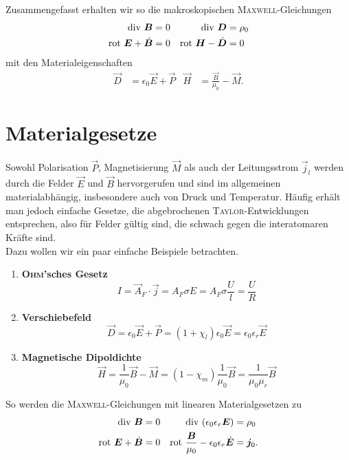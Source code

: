 Zusammengefasst erhalten wir so die makroskopischen \textsc{Maxwell}-Gleichungen
\begin{align*}
\text{div }\bm{B} &=0 &\text{div }\bm{D} &= \rho_0\\
\text{rot } \bm{E} + \dot{\bm{B}} &= 0 &\text{rot } \bm{H}-\dot{\bm{D}}&=0
\end{align*}
mit den Materialeigenschaften
\begin{align*}
\vec{D}&=\epsilon_0\vec{E}+\vec{P} &\vec{H} &= \frac{\vec{B}}{\mu_0} -\vec{M}.
\end{align*}

\section{Materialgesetze}

Sowohl Polarisation $\vec{P}$, Magnetisierung $\vec{M}$ als auch der Leitungsstrom $\vec{j}_l$ werden durch die Felder $\vec{E}$ und $\vec{B}$ hervorgerufen und sind im allgemeinen materialabhängig, insbesondere auch von Druck und Temperatur. Häufig erhält man jedoch einfache Gesetze, die abgebrochenen \textsc{Taylor}-Entwicklungen entsprechen, also für Felder gültig sind, die schwach gegen die interatomaren Kräfte sind.\\
Dazu wollen wir ein paar einfache Beispiele betrachten.

\begin{enumerate}
	\item \textbf{\textsc{Ohm}'sches Gesetz}
	\begin{equation*}
	I = \vec{A}_F\cdot\vec{j} = A_F\sigma E = A_F\sigma\frac{U}{l} = \frac{U}{R}
	\end{equation*}
	\item \textbf{Verschiebefeld}
	\begin{equation*}
	\vec{D}=\epsilon_0\vec{E}+\vec{P}=(1+\chi_l)\epsilon_0\vec{E}=\epsilon_0\epsilon_r \vec{E}
	\end{equation*}
	\item \textbf{Magnetische Dipoldichte}
	\begin{equation*}
	\vec{H} = \frac{1}{\mu_0}\vec{B}-\vec{M} = (1-\chi_m)\frac{1}{\mu_0}\vec{B}  = \frac{1}{\mu_0\mu_r}\vec{B}
	\end{equation*} 
\end{enumerate}

So werden die \textsc{Maxwell}-Gleichungen mit linearen Materialgesetzen zu
\begin{align*}
\text{div }\bm{B}&=0 &\text{div }(\epsilon_0\epsilon_r\bm{E})&=\rho_0\\
\text{rot } \bm{E}+\dot{\bm{B}}&=0 &\text{rot }\frac{\bm{B}}{\mu_0}-\epsilon_0\epsilon_r\dot{\bm{E}}&=\bm{j}_0.
\end{align*}

